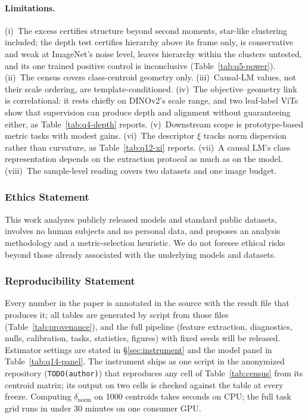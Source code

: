 \documentclass{article}
\theoremstyle{definition}
\begin{document}
\paragraph{Limitations.} (i)~The excess certifies structure beyond second moments, star-like clustering included; the depth test certifies hierarchy above its frame only, is conservative and weak at ImageNet's noise level, leaves hierarchy within the clusters untested, and its one trained positive control is inconclusive (Table~\ref{tab:q5-power}). (ii)~The census covers class-centroid geometry only. (iii)~Causal-LM values, not their scale ordering, are template-conditioned. (iv)~The objective--geometry link is correlational: it rests chiefly on DINOv2's scale range, and two leaf-label ViTs show that supervision can produce depth and alignment without guaranteeing either, as Table~\ref{tab:q4-depth} reports. (v)~Downstream scope is prototype-based metric tasks with modest gains. (vi)~The descriptor $\xi$ tracks norm dispersion rather than curvature, as Table~\ref{tab:q12-xi} reports. (vii)~A causal LM's class representation depends on the extraction protocol as much as on the model. (viii)~The sample-level reading covers two datasets and one image budget.

\subsubsection*{Ethics Statement}
This work analyzes publicly released models and standard public datasets, involves no human subjects and no personal data, and proposes an analysis methodology and a metric-selection heuristic. We do not foresee ethical risks beyond those already associated with the underlying models and datasets.

\subsubsection*{Reproducibility Statement}
Every number in the paper is annotated in the source with the result file that produces it; all tables are generated by script from those files (Table~\ref{tab:provenance}), and the full pipeline (feature extraction, diagnostics, nulls, calibration, tasks, statistics, figures) with fixed seeds will be released. Estimator settings are stated in \S\ref{sec:instrument} and the model panel in Table~\ref{tab:q14-panel}. The instrument ships as one script in the anonymized repository (\texttt{TODO(author)}) that reproduces any cell of Table~\ref{tab:census} from its centroid matrix; its output on two cells is checked against the table at every freeze. Computing $\delta_{\text{norm}}$ on 1000 centroids takes seconds on CPU; the full task grid runs in under 30 minutes on one consumer GPU.
\end{document}
